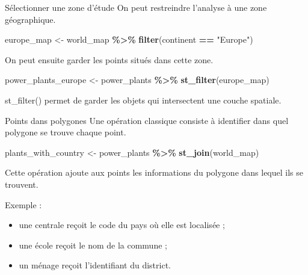 \documentclass[
  10pt,
  ignorenonframetext,
]{beamer}
\newenvironment{Shaded}{\begin{snugshade}}{\end{snugshade}}
\newcommand{\FunctionTok}[1]{\textcolor[rgb]{0.13,0.29,0.53}{\textbf{#1}}}
\newcommand{\NormalTok}[1]{#1}
\newcommand{\OtherTok}[1]{\textcolor[rgb]{0.56,0.35,0.01}{#1}}
\newcommand{\SpecialCharTok}[1]{\textcolor[rgb]{0.81,0.36,0.00}{\textbf{#1}}}
\newcommand{\StringTok}[1]{\textcolor[rgb]{0.31,0.60,0.02}{#1}}
\begin{document}
\begin{frame}[fragile]{Sélectionner une zone d'étude}
\label{suxe9lectionner-une-zone-duxe9tude}
On peut restreindre l'analyse à une zone géographique.

\begin{Shaded}
\begin{Highlighting}[]
\NormalTok{europe\_map }\OtherTok{\textless{}{-}}\NormalTok{ world\_map }\SpecialCharTok{\%\textgreater{}\%}
  \FunctionTok{filter}\NormalTok{(continent }\SpecialCharTok{==} \StringTok{"Europe"}\NormalTok{)}
\end{Highlighting}
\end{Shaded}

On peut ensuite garder les points situés dans cette zone.

\begin{Shaded}
\begin{Highlighting}[]
\NormalTok{power\_plants\_europe }\OtherTok{\textless{}{-}}\NormalTok{ power\_plants }\SpecialCharTok{\%\textgreater{}\%}
  \FunctionTok{st\_filter}\NormalTok{(europe\_map)}
\end{Highlighting}
\end{Shaded}

st\_filter() permet de garder les objets qui intersectent une couche
spatiale.
\end{frame}

\begin{frame}[fragile]{Points dans polygones}
\label{points-dans-polygones}
Une opération classique consiste à identifier dans quel polygone se
trouve chaque point.

\begin{Shaded}
\begin{Highlighting}[]
\NormalTok{plants\_with\_country }\OtherTok{\textless{}{-}}\NormalTok{ power\_plants }\SpecialCharTok{\%\textgreater{}\%}
  \FunctionTok{st\_join}\NormalTok{(world\_map)}
\end{Highlighting}
\end{Shaded}

Cette opération ajoute aux points les informations du polygone dans
lequel ils se trouvent.

Exemple :

\begin{itemize}
\item une centrale reçoit le code du pays où elle est localisée ;
\item une école reçoit le nom de la commune ;
\item un ménage reçoit l’identifiant du district.
\end{itemize}
\end{frame}
\end{document}
